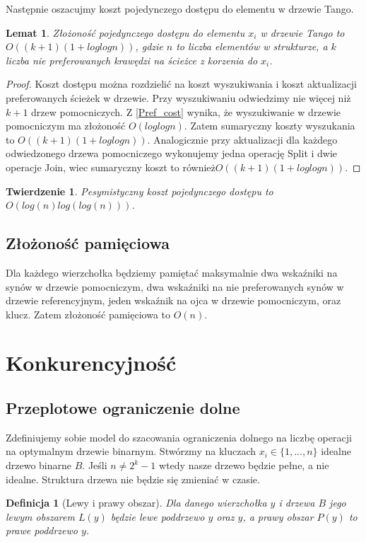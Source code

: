 \documentclass[declaration,shortabstract]{iithesis}
\newcounter{thm}[section]
\theoremstyle{thm}
\newtheorem{definition}[thm]{Definicja}
\theoremstyle{remark}
\theoremstyle{plain}
\newtheorem{theorem}[thm]{Twierdzenie}
\theoremstyle{plain}
\theoremstyle{plain}
\newtheorem{lemma}[thm]{Lemat}
\begin{document}
Następnie oszacujmy koszt pojedynczego dostępu do elementu w drzewie Tango.
\begin{lemma} 
\label{Tango_cost} Złożoność pojedynczego dostępu do elementu \(x_i\) w drzewie Tango to \(O((k+1)(1+loglogn))\), gdzie $n$ to liczba elementów w strukturze, a $k$ liczba nie preferowanych krawędzi na ścieżce z korzenia do \(x_i\). 
\end{lemma} 
\begin{proof} Koszt dostępu można rozdzielić na koszt wyszukiwania i koszt aktualizacji preferowanych ścieżek w drzewie. Przy wyszukiwaniu odwiedzimy nie więcej niż $k+1$ drzew pomocniczych. Z \ref{Pref_cost} wynika, że wyszukiwanie w drzewie pomocniczym ma złożoność \(O(loglogn)\). Zatem sumaryczny koszty wyszukania to \(O((k+1)(1+loglogn))\). Analogicznie przy aktualizacji dla każdego odwiedzonego drzewa pomocniczego wykonujemy jedna operację Split i dwie operacje Join, wiec sumaryczny koszt to również\(O((k+1)(1+loglogn))\). 
\end{proof} 
\begin{theorem} Pesymistyczny koszt pojedynczego dostępu to \(O(log(n)log(log(n)))\). 
\end{theorem} 

\subsection{Złożoność pamięciowa} Dla każdego wierzchołka będziemy pamiętać maksymalnie dwa wskaźniki na synów w drzewie pomocniczym, dwa wskaźniki na nie preferowanych synów w drzewie referencyjnym, jeden wskaźnik na ojca w drzewie pomocniczym, oraz klucz. Zatem złożoność pamięciowa to \( O (n)\). 

\section{Konkurencyjność}   

\subsection{Przeplotowe ograniczenie dolne} Zdefiniujemy sobie model do szacowania ograniczenia dolnego na liczbę operacji na optymalnym drzewie binarnym. Stwórzmy na kluczach $x_i \in \{1, ..., n\}$ idealne drzewo binarne \(B\). Jeśli \( n \neq 2^k -1\) wtedy nasze drzewo będzie pełne, a nie idealne. Struktura drzewa nie będzie się zmieniać w czasie.  

\begin{definition}[Lewy i prawy obszar] 
Dla danego wierzchołka \(y\) i drzewa \(B\) jego lewym obszarem \(L(y)\) będzie lewe poddrzewo \(y\) oraz \(y\), a prawy obszar \(P(y)\) to prawe poddrzewo \(y\).
\end{definition}  
\end{document}
